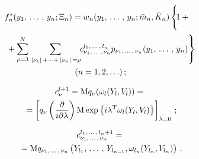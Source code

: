 \begin{multicols}{2}
\vspace*{-8pt}

\noindent
    \begin{multline}
    \hspace*{-6pt}f_n^* (y_1 \tr y_n;\Xi_n) =w_n(y_1\tr y_n;\bar m_n ,\bar K_n) 
 \left\{\! \vphantom{\sss_{\rho=3}^N}
 1+{}\right.\\
\left. {}+\sss_{\rho=3}^N \sss_{\lv\nu_1\rv +\cdots+ \lv \nu_n\rv
    =\rho} \hspace*{-2.74464pt} c_{\nu_1\tr \nu_n}^{l_1\tr l_n} p_{\nu_1\tr \nu_n} (y_1\tr
    y_n)\right\}\\ 
    (n=1,2,\ldots)\,;\label{e4.1-sin}
    \end{multline}
    
    \vspace*{-12pt}
    
    \noindent
\begin{multline}
c_\nu^{l+1} = {\mathrm{M}}q_\nu (\omega_l(Y_l,V_l))={}\\
{}=
    \left[ q_\nu \left( \displaystyle\frac{\displaystyle \partial\mathstrut}{\displaystyle i\partial \lambda\mathstrut}\right)
    {\mathrm{M}}\exp \left\{ i\lambda^{\mathrm{T}} \omega_l (Y_l, V_l)\right\}\right]_{\lambda=0}\,;\label{e4.2-sin}
    \end{multline}
    
    \vspace*{-12pt}
    
    \noindent
    \begin{multline}
     c_{\nu_1,\,\ldots\,,\, \nu_n}^{l_1,\,\ldots\,,\, l_{n}+1} ={}\\
     {}= {\mathrm{M}}q_{\nu_1,\,\ldots\,,\, \nu_n}
    \left(Y_{l_1},\,\ldots\,,\, Y_{l_{n-1}}, \omega_{l_n} (Y_{l_n},
    V_{l_n})\right)\,.\label{e4.3-sin}
    \end{multline}
    
    
    \end{multicols}
    
    
